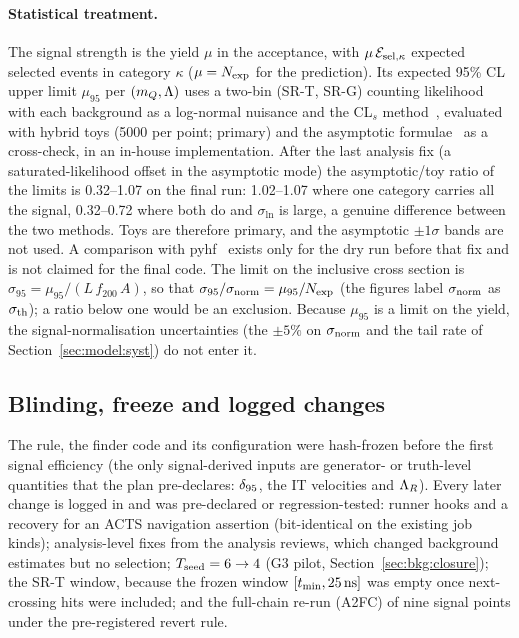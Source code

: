\paragraph{Statistical treatment.} The signal strength is the yield $\mu$ in the acceptance, with
$\mu\,\mathcal{E}_{{\rm sel},\kappa}$ expected selected events in category $\kappa$ ($\mu=N_{\rm exp}$ for the prediction).
Its expected 95\% CL upper limit $\mu_{95}$ per $(m_Q,\Lambda)$ uses a two-bin
(SR-T, SR-G) counting likelihood with each background as a log-normal nuisance and the CL$_s$
method~\cite{Junk:1999kv,Read:2002hq}, evaluated with hybrid toys (5000 per point; primary) and the asymptotic
formulae~\cite{Cowan:2010js} as a cross-check, in an in-house implementation. After the last analysis fix (a
saturated-likelihood offset in the asymptotic mode) the asymptotic/toy ratio of the limits is 0.32--1.07 on the final
run: 1.02--1.07 where one category carries all the signal, 0.32--0.72 where both do and $\sigma_{\ln}$ is large, a
genuine difference between the two methods. Toys are therefore primary, and the asymptotic $\pm1\sigma$ bands are not
used. A comparison with pyhf~\cite{Heinrich:2021gyp} exists only for the dry run before that fix and is not claimed for the final
code. The limit on the inclusive cross section is $\sigma_{95}=\mu_{95}/(L\,f_{200}\,A)$, so that
$\sigma_{95}/\sigma_{\rm norm}=\mu_{95}/N_{\rm exp}$ (the figures label $\sigma_{\rm norm}$ as $\sigma_{\rm th}$); a ratio
below one would be an exclusion. Because $\mu_{95}$ is a limit on the yield, the signal-normalisation uncertainties
(the $\pm5\%$ on $\sigma_{\rm norm}$ and the tail rate of Section~\ref{sec:model:syst}) do not enter it.

\subsection{Blinding, freeze and logged changes}\label{sec:strategy:freeze}
The rule, the finder code and its configuration were hash-frozen before the first signal efficiency (the only
signal-derived inputs are generator- or truth-level quantities that the plan pre-declares: $\delta_{95}$, the IT
velocities and $\Lambda_R$). Every later change is logged in  and was pre-declared or
regression-tested: runner hooks and a recovery for an ACTS navigation assertion (bit-identical on the existing job kinds);
analysis-level fixes from the analysis reviews, which changed background estimates but no selection; $T_{\rm seed}=6\to4$
(G3 pilot, Section~\ref{sec:bkg:closure}); the SR-T window, because the frozen window $[t_{\min},25\,\mathrm{ns}]$ was empty once
next-crossing hits were included; and the full-chain re-run (A2FC) of nine signal points under the pre-registered revert
rule.
